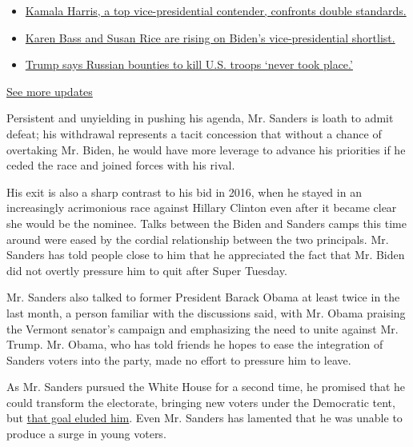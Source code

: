 \begin{itemize}
\tightlist
\item
  \href{https://www.nytimes.com/2020/07/31/us/elections/biden-vs-trump.html?action=click\&pgtype=Article\&state=default\&region=MAIN_CONTENT_1\&context=storylines_live_updates\#link-29fdff45}{Kamala
  Harris, a top vice-presidential contender, confronts double
  standards.}
\item
  \href{https://www.nytimes.com/2020/07/31/us/elections/biden-vs-trump.html?action=click\&pgtype=Article\&state=default\&region=MAIN_CONTENT_1\&context=storylines_live_updates\#link-13ec3d9c}{Karen
  Bass and Susan Rice are rising on Biden's vice-presidential
  shortlist.}
\item
  \href{https://www.nytimes.com/2020/07/31/us/elections/biden-vs-trump.html?action=click\&pgtype=Article\&state=default\&region=MAIN_CONTENT_1\&context=storylines_live_updates\#link-49e9a016}{Trump
  says Russian bounties to kill U.S. troops `never took place.'}
\end{itemize}

\href{https://www.nytimes.com/2020/07/31/us/elections/biden-vs-trump.html?action=click\&pgtype=Article\&state=default\&region=MAIN_CONTENT_1\&context=storylines_live_updates}{See
more updates}

Persistent and unyielding in pushing his agenda, Mr. Sanders is loath to
admit defeat; his withdrawal represents a tacit concession that without
a chance of overtaking Mr. Biden, he would have more leverage to advance
his priorities if he ceded the race and joined forces with his rival.

His exit is also a sharp contrast to his bid in 2016, when he stayed in
an increasingly acrimonious race against Hillary Clinton even after it
became clear she would be the nominee. Talks between the Biden and
Sanders camps this time around were eased by the cordial relationship
between the two principals. Mr. Sanders has told people close to him
that he appreciated the fact that Mr. Biden did not overtly pressure him
to quit after Super Tuesday.

Mr. Sanders also talked to former President Barack Obama at least twice
in the last month, a person familiar with the discussions said, with Mr.
Obama praising the Vermont senator's campaign and emphasizing the need
to unite against Mr. Trump. Mr. Obama, who has told friends he hopes to
ease the integration of Sanders voters into the party, made no effort to
pressure him to leave.

As Mr. Sanders pursued the White House for a second time, he promised
that he could transform the electorate, bringing new voters under the
Democratic tent, but
\href{https://www.nytimes.com/2020/02/24/us/politics/bernie-sanders-democratic-voters.html}{that
goal eluded him}. Even Mr. Sanders has lamented that he was unable to
produce a surge in young voters.

